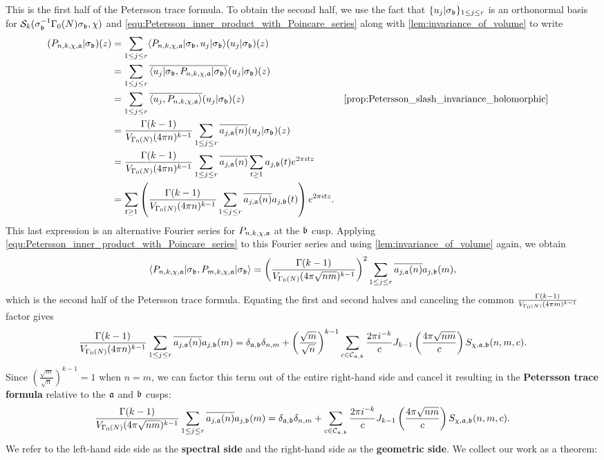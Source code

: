     This is the first half of the Petersson trace formula. To obtain the second half, we use the fact that $\{u_{j}|\sigma_{\mathfrak{b}}\}_{1 \le j \le r}$ is an orthonormal basis for $\mathcal{S}_{k}(\sigma_{\mathfrak{b}}^{-1}\Gamma_{0}(N)\sigma_{\mathfrak{b}},\chi)$ and \cref{equ:Petersson_inner_product_with_Poincare_series} along with \cref{lem:invariance_of_volume} to write
    \begin{align*}
      (P_{n,k,\chi,\mf{a}}|\s_{\mf{b}})(z) &= \sum_{1 \le j \le r}\<P_{n,k,\chi,\mf{a}}|\s_{\mf{b}},u_{j}|\s_{\mf{b}}\>(u_{j}|\s_{\mf{b}})(z) \\
      &= \sum_{1 \le j \le r}\conj{\<u_{j}|\s_{\mf{b}},P_{n,k,\chi,\mf{a}}|\s_{\mf{b}}\>}(u_{j}|\s_{\mf{b}})(z) \\&= \sum_{1 \le j \le r}\conj{\<u_{j},P_{n,k,\chi,\mf{a}}\>}(u_{j}|\s_{\mf{b}})(z) && \text{\cref{prop:Petersson_slash_invariance_holomorphic}} \\
      &= \frac{\G(k-1)}{V_{\G_{0}(N)}(4\pi n)^{k-1}}\sum_{1 \le j \le r}\conj{a_{j,\mf{a}}(n)}(u_{j}|\s_{\mf{b}})(z) \\
      &= \frac{\G(k-1)}{V_{\G_{0}(N)}(4\pi n)^{k-1}}\sum_{1 \le j \le r}\conj{a_{j,\mf{a}}(n)}\sum_{t \ge 1}a_{j,\mf{b}}(t)e^{2\pi itz} \\
      &= \sum_{t \ge 1}\left(\frac{\G(k-1)}{V_{\G_{0}(N)}(4\pi n)^{k-1}}\sum_{1 \le j \le r}\conj{a_{j,\mf{a}}(n)}a_{j,\mf{b}}(t)\right)e^{2\pi itz}.
    \end{align*}
    This last expression is an alternative Fourier series for $P_{n,k,\chi,\mathfrak{a}}$ at the $\mathfrak{b}$ cusp. Applying \cref{equ:Petersson_inner_product_with_Poincare_series} to this Fourier series and using \cref{lem:invariance_of_volume} again, we obtain
    \[
      \langle P_{n,k,\chi,\mathfrak{a}}|\sigma_{\mathfrak{b}},P_{m,k,\chi,\mathfrak{a}}|\sigma_{\mathfrak{b}}\rangle = \left(\frac{\Gamma(k-1)}{V_{\Gamma_{0}(N)}(4\pi \sqrt{nm})^{k-1}}\right)^{2}\sum_{1 \le j \le r}\overline{a_{j,\mathfrak{a}}(n)}a_{j,\mathfrak{b}}(m),
    \]
    which is the second half of the Petersson trace formula. Equating the first and second halves and canceling the common $\frac{\Gamma(k-1)}{V_{\Gamma_{0}(N)}(4\pi m)^{k-1}}$ factor gives
    \[
      \frac{\Gamma(k-1)}{V_{\Gamma_{0}(N)}(4\pi n)^{k-1}}\sum_{1 \le j \le r}\overline{a_{j,\mathfrak{a}}(n)}a_{j,\mathfrak{b}}(m) = \delta_{\mathfrak{a},\mathfrak{b}}\delta_{n,m}+\left(\frac{\sqrt{m}}{\sqrt{n}}\right)^{k-1}\sum_{c \in \mathcal{C}_{\mathfrak{a},\mathfrak{b}}}\frac{2\pi i^{-k}}{c}J_{k-1}\left(\frac{4\pi\sqrt{nm}}{c}\right)S_{\chi,\mathfrak{a},\mathfrak{b}}(n,m,c).
    \]
    Since $\left(\frac{\sqrt{m}}{\sqrt{n}}\right)^{k-1} = 1$ when $n = m$, we can factor this term out of the entire right-hand side and cancel it resulting in the \textbf{Petersson trace formula} relative to the $\mathfrak{a}$ and $\mathfrak{b}$ cusps:
    \[
      \frac{\Gamma(k-1)}{V_{\Gamma_{0}(N)}(4\pi \sqrt{nm})^{k-1}}\sum_{1 \le j \le r}\overline{a_{j,\mathfrak{a}}(n)}a_{j,\mathfrak{b}}(m) = \delta_{\mathfrak{a},\mathfrak{b}}\delta_{n,m}+\sum_{c \in \mathcal{C}_{\mathfrak{a},\mathfrak{b}}}\frac{2\pi i^{-k}}{c}J_{k-1}\left(\frac{4\pi\sqrt{nm}}{c}\right)S_{\chi,\mathfrak{a},\mathfrak{b}}(n,m,c).
    \]
    We refer to the left-hand side side as the \textbf{spectral side} and the right-hand side as the \textbf{geometric side}. We collect our work as a theorem:

